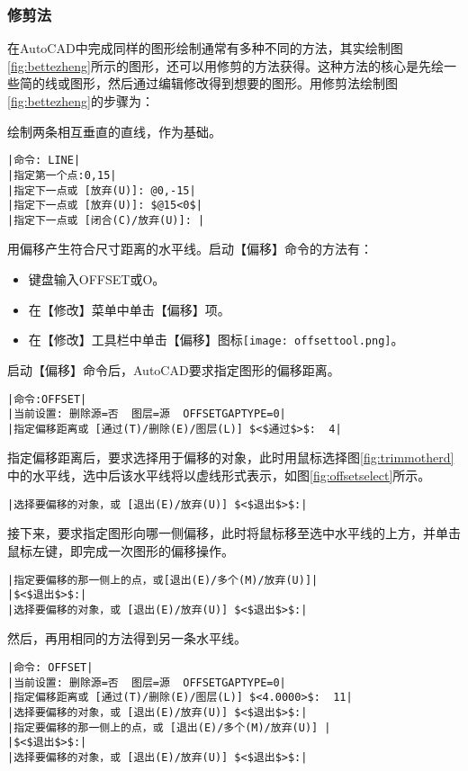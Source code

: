 \subsubsection{修剪法}
在AutoCAD中完成同样的图形绘制通常有多种不同的方法，其实绘制图\ref{fig:bettezheng}所示的图形，还可以用修剪的方法获得。这种方法的核心是先绘一些简的线或图形，然后通过编辑修改得到想要的图形。用修剪法绘制图\ref{fig:bettezheng}的步骤为：
\begin{procedure}
\item 绘制两条相互垂直的直线，作为基础。
\begin{lstlisting}
|命令: LINE|
|指定第一个点:0,15|
|指定下一点或 [放弃(U)]: @0,-15|
|指定下一点或 [放弃(U)]: $@15<0$|
|指定下一点或 [闭合(C)/放弃(U)]: |
\end{lstlisting}
\item 用偏移产生符合尺寸距离的水平线。启动【偏移】命令的方法有：
\begin{itemize}
\item 键盘输入OFFSET或O。
\item 在【修改】菜单中单击【偏移】项。
\item 在【修改】工具栏中单击【偏移】图标\texttt{[image: offsettool.png]}。
\end{itemize}
启动【偏移】命令后，AutoCAD要求指定图形的偏移距离。
\begin{lstlisting}
|命令:OFFSET|
|当前设置: 删除源=否  图层=源  OFFSETGAPTYPE=0|
|指定偏移距离或 [通过(T)/删除(E)/图层(L)] $<$通过$>$:  4|
\end{lstlisting}
指定偏移距离后，要求选择用于偏移的对象，此时用鼠标选择图\ref{fig:trimmotherd}中的水平线，选中后该水平线将以虚线形式表示，如图\ref{fig:offsetselect}所示。
\begin{lstlisting}
|选择要偏移的对象，或 [退出(E)/放弃(U)] $<$退出$>$:|
\end{lstlisting}
接下来，要求指定图形向哪一侧偏移，此时将鼠标移至选中水平线的上方，并单击鼠标左键，即完成一次图形的偏移操作。
\begin{lstlisting}
|指定要偏移的那一侧上的点，或[退出(E)/多个(M)/放弃(U)]|
|$<$退出$>$:|
|选择要偏移的对象，或 [退出(E)/放弃(U)] $<$退出$>$:|
\end{lstlisting}
然后，再用相同的方法得到另一条水平线。
\begin{lstlisting}
|命令: OFFSET|
|当前设置: 删除源=否  图层=源  OFFSETGAPTYPE=0|
|指定偏移距离或 [通过(T)/删除(E)/图层(L)] $<4.0000>$:  11|
|选择要偏移的对象，或 [退出(E)/放弃(U)] $<$退出$>$:|
|指定要偏移的那一侧上的点，或 [退出(E)/多个(M)/放弃(U)] |
|$<$退出$>$:|
|选择要偏移的对象，或 [退出(E)/放弃(U)] $<$退出$>$:|
\end{lstlisting}


\end{procedure}
